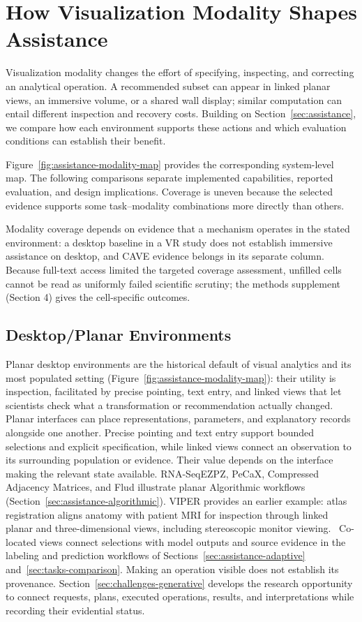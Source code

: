 \section{How Visualization Modality Shapes Assistance}
\label{sec:modality}

Visualization modality changes the effort of specifying, inspecting, and correcting an analytical operation. A recommended subset can appear in linked planar views, an immersive volume, or a shared wall display; similar computation can entail different inspection and recovery costs. Building on Section~\ref{sec:assistance}, we compare how each environment supports these actions and which evaluation conditions can establish their benefit.

Figure~\ref{fig:assistance-modality-map} provides the corresponding system-level map. The following comparisons separate implemented capabilities, reported evaluation, and design implications. Coverage is uneven because the selected evidence supports some task--modality combinations more directly than others.

Modality coverage depends on evidence that a mechanism operates in the stated environment: a desktop baseline in a VR study does not establish immersive assistance on desktop, and CAVE evidence belongs in its separate column. Because full-text access limited the targeted coverage assessment, unfilled cells cannot be read as uniformly failed scientific scrutiny; the methods supplement (Section 4) gives the cell-specific outcomes.

\subsection{Desktop/Planar Environments}
\label{sec:modality-desktop}

Planar desktop environments are the historical default of visual analytics and its most populated setting (Figure~\ref{fig:assistance-modality-map}): their utility is inspection, facilitated by precise pointing, text entry, and linked views that let scientists check what a transformation or recommendation actually changed. Planar interfaces can place representations, parameters, and explanatory records alongside one another. Precise pointing and text entry support bounded selections and explicit specification, while linked views connect an observation to its surrounding population or evidence. Their value depends on the interface making the relevant state available. RNA-SeqEZPZ, PeCaX, Compressed Adjacency Matrices, and Flud illustrate planar Algorithmic workflows (Section~\ref{sec:assistance-algorithmic}). VIPER provides an earlier example: atlas registration aligns anatomy with patient MRI for inspection through linked planar and three-dimensional views, including stereoscopic monitor viewing.~\cite{NewVIPER1998} Co-located views connect selections with model outputs and source evidence in the labeling and prediction workflows of Sections~\ref{sec:assistance-adaptive} and~\ref{sec:tasks-comparison}. Making an operation visible does not establish its provenance. Section~\ref{sec:challenges-generative} develops the research opportunity to connect requests, plans, executed operations, results, and interpretations while recording their evidential status.

